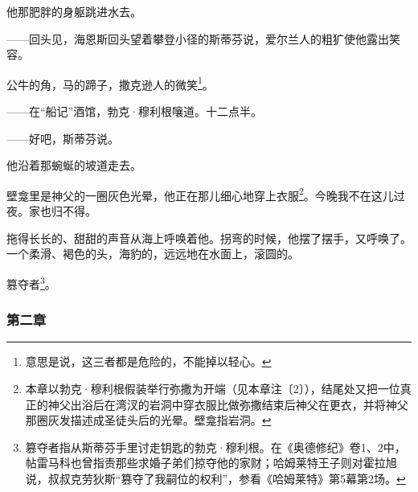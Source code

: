 \par 他那肥胖的身躯跳进水去。
\par ——回头见，海恩斯回头望着攀登小径的斯蒂芬说，爱尔兰人的粗犷使他露出笑容。
\par 公牛的角，马的蹄子，撒克逊人的微笑\footnote{意思是说，这三者都是危险的，不能掉以轻心。}。
\par ——在“船记”酒馆，勃克·穆利根嚷道。十二点半。
\par ——好吧，斯蒂芬说。
\par 他沿着那蜿蜒的坡道走去。
\par 壁龛里是神父的一圈灰色光晕，他正在那儿细心地穿上衣服\footnote{本章以勃克·穆利根假装举行弥撒为开端（见本章注〔2〕），结尾处又把一位真正的神父出浴后在湾汊的岩洞中穿衣服比做弥撒结束后神父在更衣，并将神父那圈灰发描述成圣徒头后的光晕。壁龛指岩洞。}。今晚我不在这儿过夜。家也归不得。
\par 拖得长长的、甜甜的声音从海上呼唤着他。拐弯的时候，他摆了摆手，又呼唤了。一个柔滑、褐色的头，海豹的，远远地在水面上，滚圆的。
\par 篡夺者\footnote{篡夺者指从斯蒂芬手里讨走钥匙的勃克·穆利根。在《奥德修纪》卷1、2中，帖雷马科也曾指责那些求婚子弟们掠夺他的家财；哈姆莱特王子则对霍拉旭说，叔叔克劳狄斯“篡夺了我嗣位的权利”，参看《哈姆莱特》第5幕第2场。}。






\subsubsection*{第二章}


